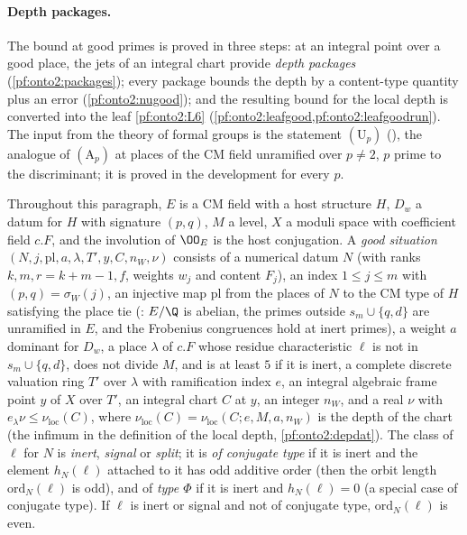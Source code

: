 \paragraph{Depth packages.} The bound at good primes is proved in three steps: at an integral point over a good place, the jets
of an integral chart provide \emph{depth packages} (\cref{pf:onto2:packages}); every package bounds the depth by a content-type
quantity plus an error (\cref{pf:onto2:nugood}); and the resulting bound for the local depth is converted into the leaf
\ref{pf:onto2:L6} (\cref{pf:onto2:leafgood,pf:onto2:leafgoodrun}). The input from the theory of formal groups is the statement
$(\mathrm U_p)$ (), the analogue of $(\mathrm A_p)$ at places of the
CM field unramified over $p\ne2$, $p$ prime to the discriminant; it is proved in the development for every $p$.

Throughout this paragraph, $E$ is a CM field with a host structure $H$, $D_w$ a datum for $H$ with signature $(p,q)$, $M$ a level,
$X$ a moduli space with coefficient field $c.F$, and the involution of $\OO_E$ is the host conjugation. A \emph{good situation}
$(N,j,\mathrm{pl},a,\lambda,T',y,C,n_W,\nu)$ consists of a numerical datum $N$ (with ranks $k,m,r=k+m-1,f$, weights $w_j$ and
content $F_j$), an index $1\le j\le m$ with $(p,q)=\sigma_W(j)$, an injective map $\mathrm{pl}$ from the places of $N$ to the CM type
of $H$ satisfying the place tie (: $E/\Q$ is abelian, the primes outside $s_m\cup\{q,d\}$
are unramified in $E$, and the Frobenius congruences hold at inert primes), a weight $a$ dominant for $D_w$, a place $\lambda$ of
$c.F$ whose residue characteristic $\ell$ is not in $s_m\cup\{q,d\}$, does not divide $M$, and is at least $5$ if it is inert, a
complete discrete valuation ring $T'$ over $\lambda$ with ramification index $e$, an integral algebraic frame point $y$ of $X$
over $T'$, an integral chart $C$ at $y$, an integer $n_W$, and a real $\nu$ with $e_\lambda\nu\le\nu_{\mathrm{loc}}(C)$, where
$\nu_{\mathrm{loc}}(C)=\nu_{\mathrm{loc}}(C;e,M,a,n_W)$ is the depth of the chart (the infimum in the definition of the local depth,
\cref{pf:onto2:depdat}). The class of $\ell$ for $N$ is \emph{inert}, \emph{signal} or \emph{split}; it is \emph{of conjugate type}
if it is inert and the element $h_N(\ell)$ attached to it has odd additive order (then the orbit length $\mathrm{ord}_N(\ell)$ is
odd), and of \emph{type $\Phi$} if it is inert and $h_N(\ell)=0$ (a special case of conjugate type). If $\ell$ is inert or signal
and not of conjugate type, $\mathrm{ord}_N(\ell)$ is even.

